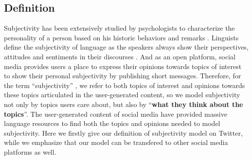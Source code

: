 \documentclass[smallcondensed]{svjour3}     %
\begin{document}
\subsection{Definition}
\label{definition}
Subjectivity has been extensively studied by psychologists to characterize the personality of a person based on his historic behaviors and remarks \cite{Engbert2007}. 
Linguists define the subjectivity of language as the speakers always show their perspectives, attitudes and sentiments in their discourses \cite{stein2005subjectivity}.
And as an open platform, social media provides users a place to express their opinions towards topics of interest to show their personal subjectivity by publishing short messages. 
Therefore, for the term ``subjectivity'' , we refer to both topics of interest and opinions towards these topics articulated in the user-generated content, so we model subjectivity not only by topics users care about, but also by ``\textbf{what they think about the topics}''.
The user-generated content of social media have provided massive language resources to find both the topics and opinions needed to model subjectivity. 
Here we firstly give our definition of subjectivity model  on Twitter, while we emphasize that our model can be transfered to other social media platforms as well.
\end{document}
